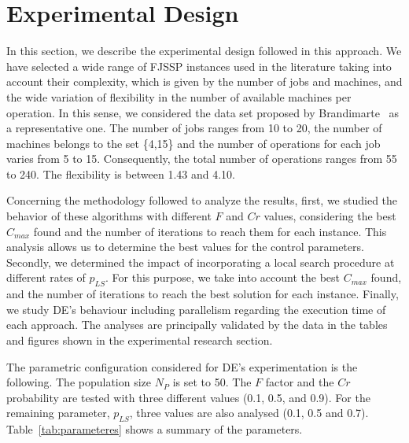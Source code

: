 \section{Experimental Design} \label{sec:experDesig}

In this section, we describe the experimental design followed in this approach. We have selected a wide range of FJSSP instances used in the literature taking into account their complexity, which is given by the number of jobs and machines, and the wide variation of flexibility in the number of available machines per operation. In this sense, we considered the data set proposed by Brandimarte~\cite{brandimarte1993} as a representative one. The number of jobs ranges from 10 to 20, the number of machines belongs to the set \{4,15\} and the number of operations for each job varies from 5 to 15. Consequently, the total number of operations ranges from 55 to 240. The flexibility is between 1.43 and 4.10.

Concerning the methodology followed to analyze the results, first, we studied the behavior of these algorithms with different $F$ and $Cr$ values, considering the best $C_{max}$ found and the number of iterations to reach them for each instance. This analysis allows us to determine the best values for the control parameters. Secondly, we determined the impact of incorporating a local search procedure at different rates of $p_{LS}$. For this purpose, we take into account the best $C_{max}$ found, and the number of iterations to reach the best solution for each instance. Finally, we study DE's behaviour including parallelism regarding the execution time of each approach. The analyses are principally validated by the data in the tables and figures shown in the experimental research section.

The parametric configuration considered for DE's experimentation is the following. The population size $N_P$ is set to 50. The $F$ factor and the $Cr$ probability are tested with three different values (0.1, 0.5, and 0.9). For the remaining parameter, $p_{LS}$, three values are also analysed (0.1, 0.5 and 0.7). Table~\ref{tab:parameteres} shows a summary of the parameters.

